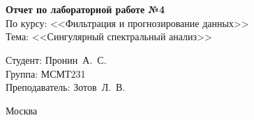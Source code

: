 \begin{titlepage}
	\centering
	
	\vspace{-2.2mm}
	\vhrulefill{0.9mm}\\
	\vspace{-7mm}
	\vhrulefill{0.2mm}\\
	\vspace{2mm}
	
	\vspace{50mm}
	
	\vspace{30mm}
	
	\textbf{Отчет по лабораторной работе №4}\\
	По курсу: <<Фильтрация и прогнозирование данных>>\\
	Тема: <<Сингулярный спектральный анализ>>\\
	
	\vspace{60mm}
	
	\hspace{70mm} Студент:       \hfill Пронин~А.~С.\\
	\hspace{70mm} Группа:        \hfill МСМТ231\\
	\hspace{70mm} Преподаватель: \hfill Зотов~Л.~В.\\
	
	\vfill
	
	Москва\\
	\the\year
\end{titlepage}

\setcounter{page}{2}